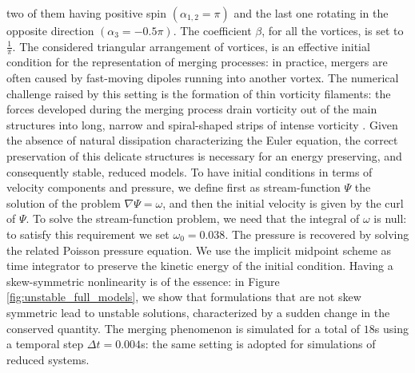 two of them having positive spin $\left( \alpha_{1,2} = \pi \right)$ and the last one rotating in the opposite direction $\left( \alpha_3 = -0.5\pi \right)$. The coefficient $\beta$, for all the vortices, is set to $\frac{1}{\pi}$. The considered triangular arrangement of vortices, is an effective initial condition for the representation of merging processes: in practice, mergers are often caused by fast-moving dipoles running into another vortex. The numerical challenge raised by this setting is the formation of thin vorticity filaments: the forces developed during the merging process drain vorticity out of the main structures into long, narrow and spiral-shaped strips of intense vorticity \cite{filaments_vort}. Given the absence of natural dissipation characterizing the Euler equation, the correct preservation of this delicate structures is necessary for an energy preserving, and consequently stable, reduced models. To have initial conditions in terms of velocity components and pressure, we define first as stream-function $\Psi$ the solution of the problem $\nabla \Psi = \omega$, and then the initial velocity is given by the curl of $\Psi$. To solve the stream-function problem, we need that the integral of $\omega$ is null: to satisfy this requirement we set $\omega_0 = 0.038$. The pressure is recovered by solving the related Poisson pressure equation. 
We use the implicit midpoint scheme as time integrator to preserve the kinetic energy of the initial condition. Having a skew-symmetric nonlinearity is of the essence: in Figure \ref{fig:unstable_full_models}, we show that formulations that are not skew symmetric lead to unstable solutions, characterized by a sudden change in the conserved quantity. The merging phenomenon is simulated for a total of $18$s using a temporal step $\Delta t=0.004$s: the same setting is adopted for simulations of reduced systems.

